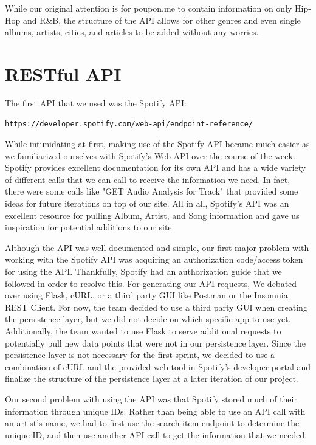 \documentclass{scrartcl}
\begin{document}
    While our original attention is for poupon.me to contain information on only Hip-Hop and R\&B, the structure of the API allows for other genres and even single albums, artists, cities, and articles to be added without any worries.

    \section{RESTful API}\label{sec:restfulApi}
    The first API that we used was the Spotify API:
    \begin{verbatim}
https://developer.spotify.com/web-api/endpoint-reference/
    \end{verbatim}

    While intimidating at first, making use of the Spotify API became much easier as we familiarized ourselves with Spotify's Web API over the course of the week.
    Spotify provides excellent documentation for its own API and has a wide variety of different calls that we can call to receive the information we need.
    In fact, there were some calls like "GET Audio Analysis for Track" that provided some ideas for future iterations on top of our site.
    All in all, Spotify's API was an excellent resource for pulling Album, Artist, and Song information and gave us inspiration for potential additions to our site.

    Although the API was well documented and simple, our first major problem with working with the Spotify API was acquiring an authorization code/access token for using the API.
    Thankfully, Spotify had an authorization guide that we followed in order to resolve this.
    For generating our API requests, We debated over using Flask, cURL, or a third party GUI like Postman or the Insomnia REST Client.
    For now, the team decided to use a third party GUI when creating the persistence layer, but we did not decide on which specific app to use yet.
    Additionally, the team wanted to use Flask to serve additional requests to potentially pull new data points that were not in our persistence layer.
    Since the persistence layer is not necessary for the first sprint, we decided to use a combination of cURL and the provided web tool in Spotify's developer portal and finalize the structure of the persistence layer at a later iteration of our project.

    Our second problem with using the API was that Spotify stored much of their information through unique IDs.
    Rather than being able to use an API call with an artist's name, we had to first use the search-item endpoint to determine the unique ID, and then use another API call to get the information that we needed.
\end{document}
